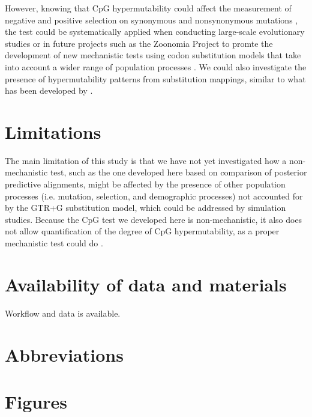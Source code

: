 \documentclass{article}
\begin{document}
However, knowing that CpG hypermutability could affect the measurement of negative and positive selection on synonymous and nonsynonymous mutations \citep{LaurinLemay2018a,LaurinLemay2022}, the test could be systematically applied when conducting large-scale evolutionary studies \citep[e.g.,][]{Murrell2015,Davydov2019,Slodkowicz2020} or in future projects such as the Zoonomia Project \citep{Zoonomia2020} to promte the development of new mechanistic tests using codon substitution models that take into account a wider range of population processes \citep[e.g.,][]{Rodrigue2010b,Lartillot2012,Rodrigue2017,LaurinLemay2018b,Rodrigue2020,Latrille2021a}. We could also investigate the presence of hypermutability patterns from substitution mappings, similar to what has been developed by \citep{Nielsen2002,Bollback2005}.

\section*{Limitations}
The main limitation of this study is that we have not yet investigated how a non-mechanistic test, such as the one developed here based on comparison of posterior predictive alignments, might be affected by the presence of other population processes (i.e. mutation, selection, and demographic processes) not accounted for by the GTR+G substitution model, which could be addressed by simulation studies. Because the CpG test we developed here is non-mechanistic, it also does not allow quantification of the degree of CpG hypermutability, as a proper mechanistic test could do \citep[e.g.,][]{LaurinLemay2018b}.

\section*{Availability of data and materials}
Workflow and data is available.

\section*{Abbreviations}


\newpage
\section*{Figures}
\end{document}
